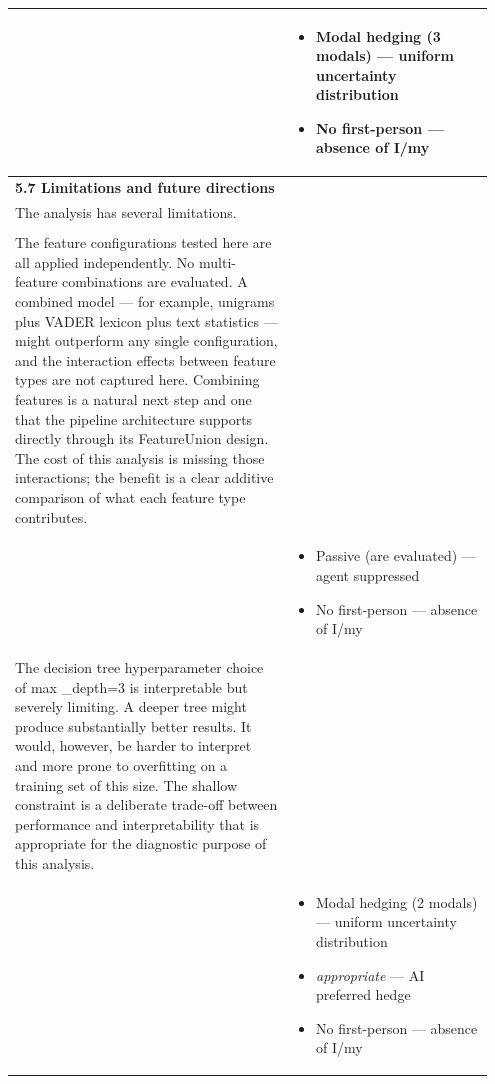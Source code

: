 \documentclass[11pt]{article}
\begin{document}
\begin{longtable}{|p{0.55\linewidth}|p{0.40\linewidth}|}
\hline
\rule[-3.5cm]{0pt}{3.5cm} & \begin{itemize}[leftmargin=1em,itemsep=1pt,topsep=1pt,parsep=0pt]
  \item Modal hedging (3 modals) --- uniform uncertainty distribution
  \item No first-person --- absence of I/my
\end{itemize} \\
\hline
\textbf{5.7 Limitations and future directions}\\[4pt]
The analysis has several limitations. & \\[2pt]
\hline
\rule[-3.5cm]{0pt}{3.5cm} &  \\
\hline
The feature configurations tested here are all applied independently. No multi-feature combinations are evaluated. A combined model --- for example, unigrams plus VADER lexicon plus text statistics --- might outperform any single configuration, and the interaction effects between feature types are not captured here. Combining features is a natural next step and one that the pipeline architecture supports directly through its FeatureUnion design. The cost of this analysis is missing those interactions; the benefit is a clear additive comparison of what each feature type contributes. & \\[2pt]
\hline
\rule[-3.5cm]{0pt}{3.5cm} & \begin{itemize}[leftmargin=1em,itemsep=1pt,topsep=1pt,parsep=0pt]
  \item Passive (are evaluated) --- agent suppressed
  \item No first-person --- absence of I/my
\end{itemize} \\
\hline
The decision tree hyperparameter choice of max \_depth=3 is interpretable but severely limiting. A deeper tree might produce substantially better results. It would, however, be harder to interpret and more prone to overfitting on a training set of this size. The shallow constraint is a deliberate trade-off between performance and interpretability that is appropriate for the diagnostic purpose of this analysis. & \\[2pt]
\hline
\rule[-3.5cm]{0pt}{3.5cm} & \begin{itemize}[leftmargin=1em,itemsep=1pt,topsep=1pt,parsep=0pt]
  \item Modal hedging (2 modals) --- uniform uncertainty distribution
  \item \textit{appropriate} --- AI preferred hedge
  \item No first-person --- absence of I/my

\end{itemize}
\end{longtable}
\end{document}
